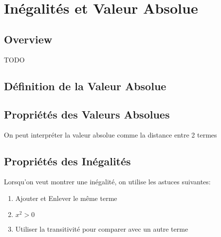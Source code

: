 \documentclass{article}
\begin{document}
\begin{problem}
\end{problem}

\pagebreak

\section{Inégalités et Valeur Absolue}

\subsection{Overview}

TODO

\subsection{Définition de la Valeur Absolue}

\begin{definition}
\end{definition}

\subsection{Propriétés des Valeurs Absolues}

\begin{remark}
    On peut interpréter la valeur absolue comme la distance entre 2 termes
\end{remark}

\subsection{Propriétés des Inégalités}

\begin{problem}
    Lorsqu'on veut montrer une inégalité, on utilise les astuces suivantes:\\

    \begin{enumerate}
	\item Ajouter et Enlever le même terme
	\item $x^2 > 0$
	\item Utiliser la transitivité pour comparer avec un autre terme
    \end{enumerate}

\end{problem}
\end{document}
